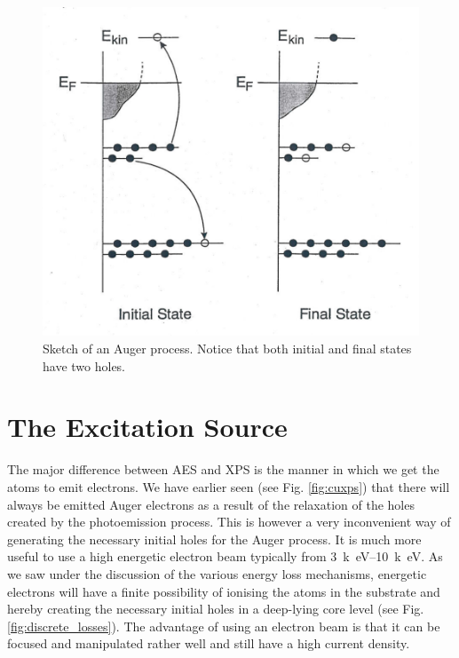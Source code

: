 \begin{figure}[h!]
	\begin{center}
	\includegraphics[scale=2.5]{figures/06_01.png}
	\caption{Sketch of an  Auger  process. Notice that both initial and final states have two holes.}
	\label{fig:aes}
	\end{center}
\end{figure}

\section{The Excitation Source}\label{sec:aessource}
The major difference between AES and XPS is the manner in which we get the atoms to emit electrons. We have earlier seen (see Fig. \ref{fig:cuxps}) that there will always be emitted Auger electrons as a result of the relaxation of the holes created by the photoemission process. This is however a very inconvenient way of generating the necessary initial holes for the Auger process. It is much more useful to use a high energetic electron beam typically from \SIrange{3}{10}{k\electronvolt}. As we saw under the discussion of the various energy loss mechanisms, energetic electrons will have a finite possibility of ionising the atoms in the substrate and hereby creating the necessary initial holes in a deep-lying core level (see Fig. \ref{fig:discrete_losses}). The advantage of using an electron beam is that it can be focused and manipulated rather well and still have a high current density.
        

